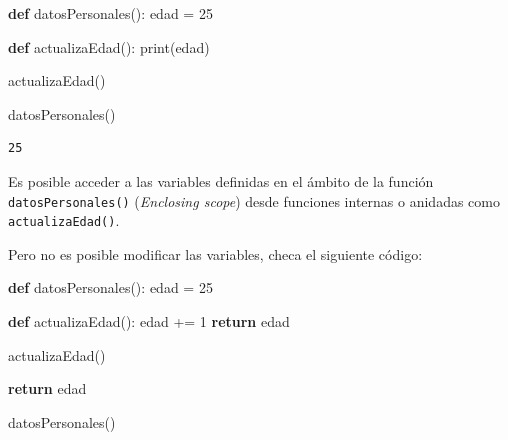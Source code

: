 \documentclass[
  spanish,
  letterpaper,
]{scrbook}
\newenvironment{Shaded}{\begin{snugshade}}{\end{snugshade}}
\newcommand{\BuiltInTok}[1]{\textcolor[rgb]{0.00,0.23,0.31}{#1}}
\newcommand{\ControlFlowTok}[1]{\textcolor[rgb]{0.00,0.23,0.31}{\textbf{#1}}}
\newcommand{\DecValTok}[1]{\textcolor[rgb]{0.68,0.00,0.00}{#1}}
\newcommand{\KeywordTok}[1]{\textcolor[rgb]{0.00,0.23,0.31}{\textbf{#1}}}
\newcommand{\NormalTok}[1]{\textcolor[rgb]{0.00,0.23,0.31}{#1}}
\newcommand{\OperatorTok}[1]{\textcolor[rgb]{0.37,0.37,0.37}{#1}}
\theoremstyle{definition}
\theoremstyle{remark}
\begin{document}
\begin{Shaded}
\begin{Highlighting}[]
\KeywordTok{def}\NormalTok{ datosPersonales():}
\NormalTok{    edad }\OperatorTok{=} \DecValTok{25}

    \KeywordTok{def}\NormalTok{ actualizaEdad():}
        \BuiltInTok{print}\NormalTok{(edad)}

\NormalTok{    actualizaEdad()}

\NormalTok{datosPersonales()}
\end{Highlighting}
\end{Shaded}

\begin{verbatim}
25
\end{verbatim}

Es posible acceder a las variables definidas en el ámbito de la función
\texttt{datosPersonales()} (\emph{Enclosing scope}) desde funciones
internas o anidadas como \texttt{actualizaEdad()}.

Pero no es posible modificar las variables, checa el siguiente código:

\begin{Shaded}
\begin{Highlighting}[]
\KeywordTok{def}\NormalTok{ datosPersonales():}
\NormalTok{    edad }\OperatorTok{=} \DecValTok{25}

    \KeywordTok{def}\NormalTok{ actualizaEdad():}
\NormalTok{        edad }\OperatorTok{+=} \DecValTok{1}
        \ControlFlowTok{return}\NormalTok{ edad}

\NormalTok{    actualizaEdad()}

    \ControlFlowTok{return}\NormalTok{ edad}

\NormalTok{datosPersonales()}
\end{Highlighting}
\end{Shaded}
\end{document}
